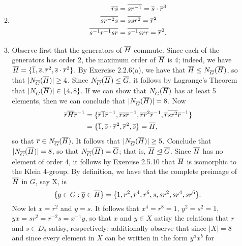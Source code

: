 \begin{enumerate}
\begin{enumerate}
\begin{align*}
               \end{align*}
         \item \begin{align*}
                  \overline{rs} &= \overline{sr^{-1}} = \overline{s}\cdot\overline{r}^3 \\
                  \overline{sr^{-2}s} &= \overline{ssr^2} = \overline{r}^2 \\
                  \overline{s^{-1}r^{-1}sr} &= \overline{s^{-1}srr} = \overline{r}^2.
               \end{align*}
         \item Observe first that the generators of $\overline{H}$ commute. Since each
               of the generators has order 2, the maximum order of $\overline{H}$ is 4;
               indeed, we have $\overline{H} = \{\overline{1}, \overline{s}, \overline{r}^2,
               \overline{s}\cdot\overline{r}^2\}$. By Exercise 2.2.6(a), we have that
               $\overline{H} \le N_{\overline{G}}(\overline{H})$, so that $|N_{\overline{G}}(\overline{H})| \ge 4$.
               Since $N_{\overline{G}}(\overline{H}) \le \overline{G}$, it follows by Lagrange's
               Theorem that $|N_{\overline{G}}(\overline{H})| \in \{4, 8\}$. If we can show
               that $N_{\overline{G}}(\overline{H})$ has at least 5 elements, then we can
               conclude that $|N_{\overline{G}}(\overline{H})| = 8$. Now
               \begin{align*}
                  \overline{r}\overline{H}\overline{r}^{-1} &= \{\overline{r}\overline{1}\overline{r}^{-1},
                     \overline{r}\overline{s}\overline{r}^{-1}, \overline{r}\overline{r}^2\overline{r}^{-1},
                     \overline{r}\overline{sr^2}\overline{r}^{-1}\} \\
                     &= \{\overline{1}, \overline{s}\cdot\overline{r}^2, \overline{r}^2, \overline{s}\} = \overline{H},
               \end{align*}
               so that $\overline{r} \in N_{\overline{G}}(\overline{H})$. It follows that
               $|N_{\overline{G}}(\overline{H})| \ge 5$. Conclude that
               $|N_{\overline{G}}(\overline{H})| = 8$, so that $N_{\overline{G}}(\overline{H}) = \overline{G}$;
               that is, $\overline{H} \trianglelefteq \overline{G}$. Since $\overline{H}$ has no
               element of order 4, it follows by Exercise 2.5.10 that $\overline{H}$ is
               isomorphic to the Klein 4-group. By definition, we have that the
               complete preimage of $\overline{H}$ in $G$, say X, is
               $$\{g \in G : \overline{g} \in \overline{H}\} =
                 \{1, r^2, r^4, r^6, s, sr^2, sr^4, sr^6\}.$$
               Now let $x = r^2$ and $y = s$. It follows that $x^4 = r^8 = 1$,
               $y^2 = s^2 = 1$, $yx = sr^2 = r^{-2}s = x^{-1}y$, so that $x$ and
               $y \in X$ satisy the relations that $r$ and $s \in D_8$ satisy, 
               respectively; additionally observe that since $|X| = 8$ and since 
               every element in $X$ can be written in the form $y^ax^b$ for 

\end{enumerate}
\end{enumerate}

